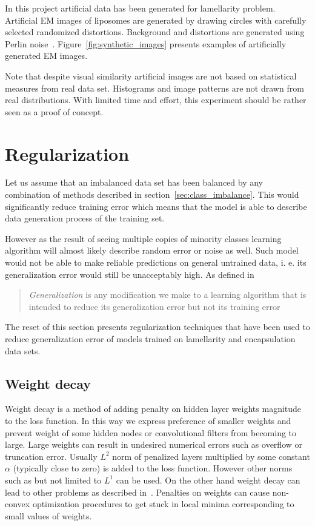 \documentclass[a4paper, 11pt, table]{article}
\begin{document}
In this project artificial data has been generated for lamellarity problem. Artificial EM images of liposomes are generated by drawing circles with carefully selected randomized distortions. Background and distortions are generated using Perlin noise~\cite{Perlin:1985:IS:325165.325247}. Figure~\ref{fig:synthetic_images} presents examples of artificially generated EM images.

Note that despite visual similarity artificial images are not based on statistical measures from real data set. Histograms and image patterns are not drawn from real distributions. With limited time and effort, this experiment should be rather seen as a proof of concept.


\section{Regularization}
\label{sec:regularization}

Let us assume that an imbalanced data set has been balanced by any combination of methods described in section~\ref{sec:class_imbalance}. This would significantly reduce training error which means that the model is able to describe data generation process of the training set. 

However as the result of seeing multiple copies of minority classes learning algorithm will almost likely describe random error or noise as well. Such model would not be able to make reliable predictions on general untrained data, i. e. its generalization error would still be unacceptably high. As defined in~\cite{dl_book} \blockquote{\textit{Generalization} is any modification we make to a learning algorithm that is intended to reduce its generalization error but not its training error}.

The reset of this section presents regularization techniques that have been used to reduce generalization error of models trained on lamellarity and encapsulation data sets.

\subsection{Weight decay}
Weight decay is a method of adding penalty on hidden layer weights magnitude to the loss function. In this way we express preference of smaller weights and prevent weight of some hidden nodes or convolutional filters from becoming to large. Large weights can result in undesired numerical errors such as overflow or truncation error. Usually $L^2$ norm of penalized layers multiplied by some constant $\alpha$ (typically close to zero) is added to the loss function. However other norms such as but not limited to $L^1$ can be used. 
On the other hand weight decay can lead to other problems as described in~\cite{dl_book}. Penalties on weights can cause non-convex optimization procedures to get stuck in local minima corresponding to small values of weights. 
\end{document}
